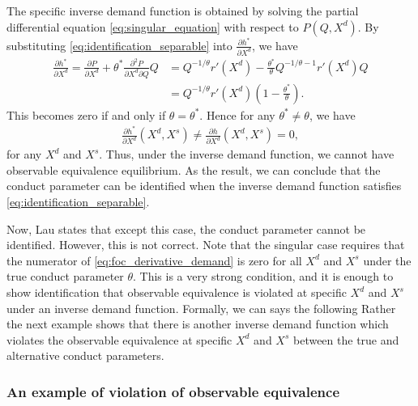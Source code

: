\documentclass[11pt, a4paper]{article}
\theoremstyle{remark}
\begin{document}
The specific inverse demand function is obtained by solving the partial differential equation \eqref{eq:singular_equation} with respect to $P(Q, X^{d})$.
By substituting \eqref{eq:identification_separable} into $\frac{\partial h^{*}}{\partial X^d}$, we have
\begin{align}
    \frac{\partial h^{*}}{\partial X^d} = \frac{\partial P}{\partial X^d} + \theta^{*} \frac{\partial^2 P}{\partial X^d\partial Q}Q  &= Q^{-1/\theta} r'(X^d) - \frac{\theta^{*}}{\theta} Q^{-1/\theta-1} r'(X^d) Q\\
    &= Q^{-1/\theta} r'(X^d) \left(1 - \frac{\theta^{*}}{\theta} \right).
\end{align}
This becomes zero if and only if $\theta= \theta^{*}$.
Hence for any $\theta^{*} \ne \theta$, we have
\begin{align}
    \frac{\partial h^{*}}{\partial X^{d}}(X^{d}, X^{s}) \ne \frac{\partial h}{\partial X^{d}}(X^{d}, X^{s}) = 0,
\end{align}
for any $X^{d}$ and $X^{s}$.
Thus, under the inverse demand function, we cannot have observable equivalence equilibrium.
As the result, we can conclude that the conduct parameter can be identified when the inverse demand function satisfies \eqref{eq:identification_separable}.

Now, Lau states that except this case, the conduct parameter cannot be identified.
However, this is not correct.
Note that the singular case requires that the numerator of \eqref{eq:foc_derivative_demand} is zero for all $X^{d}$ and $X^{s}$ under the true conduct parameter $\theta$.
This is a very strong condition, and it is enough to show identification that observable equivalence is violated at specific $X^{d}$ and $X^{s}$ under an inverse demand function.
Formally, we can says the following 
Rather the next example shows that there is another inverse demand function which violates the observable equivalence at specific $X^{d}$ and $X^{s}$ between the true and alternative conduct parameters.

\subsubsection{An example of violation of observable equivalence}\label{sec:counterexample_lau}
\end{document}
